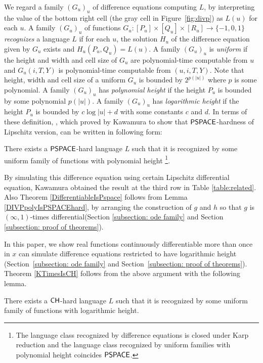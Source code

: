 We regard a family $(G_u)_u$ of difference equations computing $L$,
by interpreting the value of the bottom right cell (the gray cell in Figure~\ref{fig:divp}) as $L(u)$ for each $u$.
A family $(G_u)_u$ of functions 
$G_u \colon [P_u] \times [Q_u] \times [R_u] \to \{-1, 0, 1\}$
\emph{recognizes} a language $L$ if for each $u$,
the solution $H_u$ of the difference equation given by $G_u$ exists 
and $H_u(P_u, Q_u) = L(u)$.
A family $(G_u)_u$ is \emph{uniform} 
if the height and width and cell size of $G_u$ are polynomial-time computable from $u$
and $G_u(i, T, Y)$ is polynomial-time computable from $(u, i, T, Y)$.
Note that height, width and cell size of a uniform $G_u$ is bounded by $2^{p(|u|)}$ where $p$ is some polynomial.
A family $(G_u)_u$ has \emph{polynomial height} if the height $P_u$ is bounded by some polynomial $p(|u|)$.
A family $(G_u)_u$ has \emph{logarithmic height} if the height $P_u$ is bounded by $c \log |u| + d$ with some constants $c$ and $d$.
In terms of these definition,
\cite[Lemma 4.7]{kawamura2010lipschitz}, which proved by Kawamura to show 
that $\mathsf{PSPACE}$-hardness of Lipschitz version,
can be written in following form:
\begin{lemma}
 \label{DIVPpolyIsPSPACEhard}
 There exists a $\mathsf{PSPACE}$-hard language $L$ such that it is recognized by some uniform family of functions with polynomial height%
 \footnote{The language class recognized by difference equations
 is closed under Karp reduction and the language class recognized by 
 uniform families with polynomial height coincides $\mathsf{PSPACE}$.
 }.
\end{lemma}

By simulating this difference equation using certain Lipschitz differential equation,
Kawamura obtained the result at the third row in Table \ref{table:related}.
Also Theorem \ref{DifferentiableIsPspace} follows from Lemma \ref{DIVPpolyIsPSPACEhard},
by arranging the construction of $g$ and $h$ so that $g$ is 
$(\infty, 1)$-times differential(Section \ref{subsection: ode family} and Section \ref{subsection: proof of theorems}).

In this paper, we show real functions continuously differentiable more than once in $x$ can simulate
difference equations restricted to have logarithmic height
(Section~\ref{subsection: ode family} and Section~\ref{subsection: proof of theorems}).
Theorem \ref{KTimesIsCH} follows from the above argument with the following lemma.
\begin{lemma}
 \label{DIVPlogIsCHhard}
 There exists a $\mathsf{CH}$-hard language $L$ such that it is recognized by some uniform family of functions with logarithmic height.
\end{lemma}


